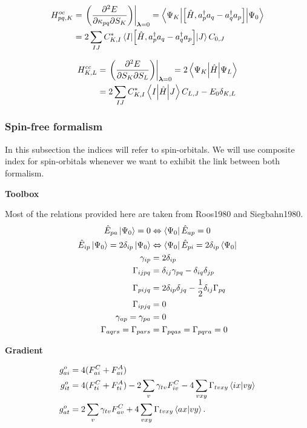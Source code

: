 \documentclass[11pt,a4paper]{article}
\newcommand{\hH}{\Hat{H}} %
\newcommand{\hE}{\Hat{E}} %
\newcommand{\cre}[1]{a_{#1}^\dagger} %
\newcommand{\ani}[1]{a_{#1}} %
\newcommand{\com}[2]{\mleft[#1,#2 \mright]}
\begin{document}
\begin{align}
  \label{eq:MCSCF_SO_CIOrb_Hessian}
  H^{oc}_{pq,K} &= \evalat*{\mleft(\pdv{E}{\kappa_{pq}}{S_{K}}\mright)}{\bm{\lambda}=0} = \mel**{\Psi_K}{\com{\hH}{\cre{p}\ani{q} - \cre{q}\ani{p}}}{\Psi_0} \\
  &= 2\sum_{IJ}C_{K,I}^*\mel{I}{\com{\hH}{\cre{p}\ani{q} - \cre{q}\ani{p}}}{J}C_{0,J} \notag
\end{align}

\begin{align}
  \label{eq:MCSCF_SO_CIOrb_Hessian}
  H^{cc}_{K,L} &= \evalat*{\mleft(\pdv{E}{S_{K}}{S_{L}}\mright)}{\bm{\lambda}=0} = 2\mel**{\Psi_K}{\hH}{\Psi_L} \\
  &= 2\sum_{IJ}C_{K,I}^*\mel**{I}{\hH}{J}C_{L,J} - E_0\delta_{K,L} \notag
\end{align}

\subsubsection{Spin-free formalism}

In this subsection the indices will refer to spin-orbitals. We will use composite index for spin-orbitals whenever we want to exhibit the link between both formalism.

\noindent\textbf{Toolbox}

Most of the relations provided here are taken from Roos1980 and Siegbahn1980.
\begin{align}
  \hE_{pa}\ket{\Psi_0} =0  &\Leftrightarrow \bra{\Psi_0}\hE_{ap} = 0 \\
  \hE_{ip}\ket{\Psi_0} =2\delta_{ip}\ket{\Psi_0} &\Leftrightarrow \bra{\Psi_0}\hE_{pi}=2\delta_{ip}\bra{\Psi_0 } \\
  \gamma_{ip}&=2\delta_{ip} \\
  \Gamma_{ijpq}&= \delta_{ij}\gamma_{pq} -\delta_{iq}\delta_{jp} \\
  \Gamma_{pijq}&= 2\delta_{ip}\delta_{jq} - \frac{1}{2}\delta_{ij}\Gamma_{pq} \\
  \Gamma_{ipjq}&=0 \\
  \gamma_{ap} = \gamma_{pa} &= 0 \\
  \Gamma_{aqrs} = \Gamma_{pars} &= \Gamma_{pqas} = \Gamma_{pqra} = 0
\end{align}

\noindent\textbf{Gradient}

\begin{subequations}
  \label{eq:MCSCF_O_Orb_Gradient}
  \begin{align}
    g^o_{ai} &= 4(F_{ai}^{C} + F_{ai}^{A}) \\
    g^o_{it} &= 4(F_{ti}^{C} + F_{ti}^{A}) - 2\sum_v \gamma_{tv}F_{iv}^C -4\sum_{vxy}\Gamma_{tvxy}\braket{ix}{vy} \\
    g^o_{at} &= 2\sum_v \gamma_{tv}F_{av}^C + 4\sum_{vxy}\Gamma_{tvxy}\braket{ax}{vy}.
  \end{align}
\end{subequations}
\end{document}
